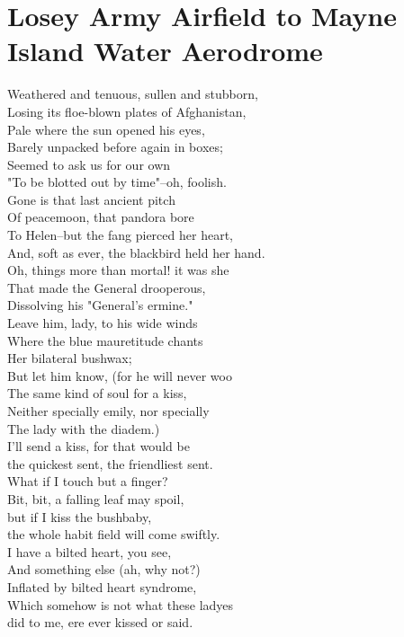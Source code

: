 \documentclass[smalldemyvopaper,11pt,twoside,onecolumn,openright,extrafontsizes]{memoir}
\begin{document}
\chapter{Losey Army Airfield to Mayne Island Water Aerodrome}
Weathered and tenuous, sullen and stubborn,
\\Losing its floe-blown plates of Afghanistan,
\\Pale where the sun opened his eyes,
\\Barely unpacked before again in boxes;
\\Seemed to ask us for our own
\\"To be blotted out by time"--oh, foolish.
\\Gone is that last ancient pitch
\\Of peacemoon, that pandora bore
\\To Helen--but the fang pierced her heart,
\\And, soft as ever, the blackbird held her hand.
\\Oh, things more than mortal! it was she
\\That made the General drooperous,
\\Dissolving his "General's ermine."
\\Leave him, lady, to his wide winds
\\Where the blue mauretitude chants
\\Her bilateral bushwax;
\\But let him know, (for he will never woo
\\The same kind of soul for a kiss,
\\Neither specially emily, nor specially
\\The lady with the diadem.)
\\I'll send a kiss, for that would be
\\the quickest sent, the friendliest sent.
\\What if I touch but a finger?
\\Bit, bit, a falling leaf may spoil,
\\but if I kiss the bushbaby,
\\the whole habit field will come swiftly.
\\I have a bilted heart, you see,
\\And something else (ah, why not?)
\\Inflated by bilted heart syndrome,
\\Which somehow is not what these ladyes
\\did to me, ere ever kissed or said.
\end{document}
